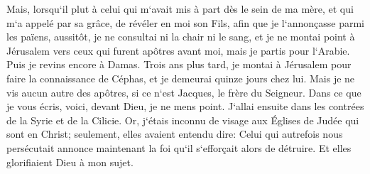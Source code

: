 \verse Mais, lorsqu`il plut à celui qui m`avait mis à part dès le sein de ma mère, et qui m`a appelé par sa grâce, 
\verse de révéler en moi son Fils, afin que je l`annonçasse parmi les païens, aussitôt, je ne consultai ni la chair ni le sang, 
\verse et je ne montai point à Jérusalem vers ceux qui furent apôtres avant moi, mais je partis pour l`Arabie. Puis je revins encore à Damas. 
\verse Trois ans plus tard, je montai à Jérusalem pour faire la connaissance de Céphas, et je demeurai quinze jours chez lui. 
\verse Mais je ne vis aucun autre des apôtres, si ce n`est Jacques, le frère du Seigneur. 
\verse Dans ce que je vous écris, voici, devant Dieu, je ne mens point. 
\verse J`allai ensuite dans les contrées de la Syrie et de la Cilicie. 
\verse Or, j`étais inconnu de visage aux Églises de Judée qui sont en Christ; 
\verse seulement, elles avaient entendu dire: Celui qui autrefois nous persécutait annonce maintenant la foi qu`il s`efforçait alors de détruire. 
\verse Et elles glorifiaient Dieu à mon sujet. 

